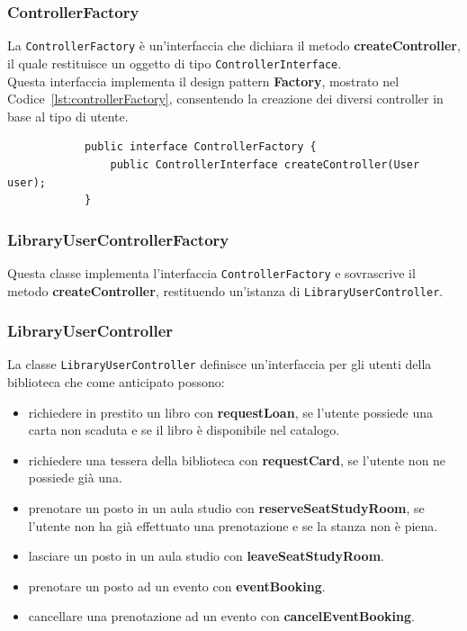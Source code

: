    \subsubsection{ControllerFactory}
    La \texttt{ControllerFactory} è un'interfaccia che dichiara il metodo \textbf{createController}, il quale restituisce un oggetto di tipo \texttt{ControllerInterface}.\\
    Questa interfaccia implementa il design pattern \textbf{Factory}, mostrato nel Codice~\ref{lst:controllerFactory}, consentendo la creazione dei diversi controller in base al tipo di utente.
    \begin{listing}[H]
        \begin{verbatim}
            public interface ControllerFactory {
                public ControllerInterface createController(User user);
            }
        \end{verbatim}
        \caption{Implementazione del pattern Factory nella classe \texttt{ControllerFactory}}
        \label{lst:controllerFactory}
    \end{listing}
        

    \subsubsection{LibraryUserControllerFactory}
    Questa classe implementa l'interfaccia \texttt{ControllerFactory} e sovrascrive il metodo \textbf{createController}, restituendo un'istanza di \texttt{LibraryUserController}.

    \subsubsection{LibraryUserController}
    La classe \texttt{LibraryUserController} definisce un'interfaccia per gli utenti della biblioteca che come anticipato possono:
    \begin{itemize}
        \item richiedere in prestito un libro con \textbf{requestLoan}, se l'utente possiede una carta non scaduta e se il libro è disponibile nel catalogo. 
        \item richiedere una tessera della biblioteca con \textbf{requestCard}, se l'utente non ne possiede già una.
        \item prenotare un posto in un aula studio con \textbf{reserveSeatStudyRoom}, se l'utente non ha già effettuato una prenotazione e se la stanza non è piena.
        \item lasciare un posto in un aula studio con \textbf{leaveSeatStudyRoom}.
        \item prenotare un posto ad un evento con \textbf{eventBooking}.
        \item cancellare una prenotazione ad un evento con \textbf{cancelEventBooking}.
    \end{itemize}

